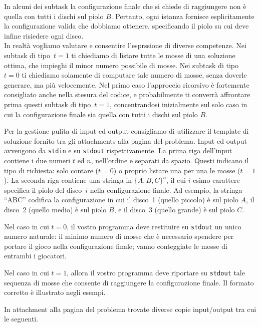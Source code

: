 In alcuni dei subtask la configurazione finale che si chiede di raggiungere non è quella con tutti i dischi sul piolo $B$. Pertanto, ogni istanza fornisce esplicitamente la configurazione valida che dobbiamo ottenere, specificando il piolo su cui deve infine risiedere ogni disco.\\ 

In realtà vogliamo valutare e consentire l'esprssione di diverse competenze. Nei subtask di tipo~$t=1$ ti chiediamo di listare tutte le mosse di una soluzione ottima, che impieghi il minor numero possibile di mosse.
Nei subtask di tipo~$t=0$ ti chiediamo solamente di computare tale numero di mosse, senza doverle generare, ma più velocemente.
Nel primo caso l'approccio ricorsivo è fortemente consigliato anche nella stesura del codice, e probabilmente ti converrà affrontare prima questi subtask di tipo~$t=1$, concentrandosi inizialmente sul solo caso in cui la configurazione finale sia quella con tutti i dischi sul piolo $B$.



Per la gestione pulita di input ed output consigliamo di utilizzare il template di soluzione fornito tra gli attachments alla pagina del problema.
Input ed output avvengono da \verb'stdin'
e su \verb'stdout' rispettivamente.
La prima riga dell'input contiene i due numeri $t$ ed $n$, nell'ordine e separati da spazio. Questi indicano il tipo di richiesta: solo contare ($t=0$) o proprio listare una per una le mosse ($t=1$).
La seconda riga contiene una stringa in $\{A,B,C\}^n$, il cui $i$-esimo carattere specifica il piolo del disco~$i$ nella configurazione finale. Ad esempio, la stringa ``ABC'' codifica la configurazione in cui il disco~1 (quello piccolo) è sul piolo $A$, il disco~2 (quello medio) è sul piolo $B$, e il disco~3 (quello grande) è sul piolo $C$. 

\indent
Nel caso in cui $t=0$, il vostro programma deve restituire su \verb'stdout' un unico numero naturale: il minimo numero di mosse che è necessario spendere per portare il gioco nella configurazione finale; vanno conteggiate le mosse di entrambi i giocatori.

\indent
Nel caso in cui $t= 1$,
allora il vostro programma deve riportare su \verb'stdout' tale sequenza di mosse che consente di raggiungere la configurazione finale. Il formato corretto è illustrato negli esempi.



In attachment alla pagina del problema trovate diverse copie input/output tra cui le seguenti.



